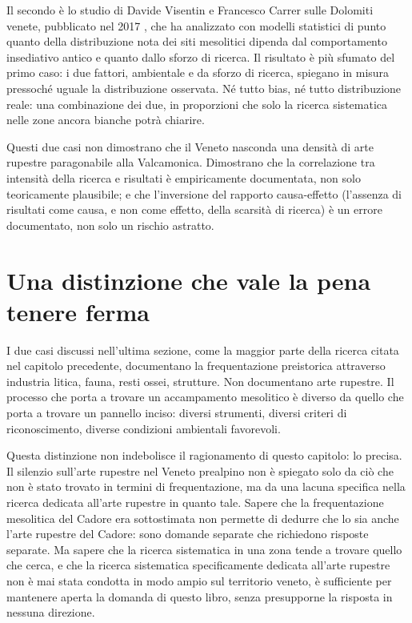 Il secondo è lo studio di Davide Visentin e Francesco Carrer sulle Dolomiti venete, pubblicato nel 2017 \citep{visentin2017}, che ha analizzato con modelli statistici di punto quanto della distribuzione nota dei siti mesolitici dipenda dal comportamento insediativo antico e quanto dallo sforzo di ricerca. Il risultato è più sfumato del primo caso: i due fattori, ambientale e da sforzo di ricerca, spiegano in misura pressoché uguale la distribuzione osservata. Né tutto bias, né tutto distribuzione reale: una combinazione dei due, in proporzioni che solo la ricerca sistematica nelle zone ancora bianche potrà chiarire.

Questi due casi non dimostrano che il Veneto nasconda una densità di arte rupestre paragonabile alla Valcamonica. Dimostrano che la correlazione tra intensità della ricerca e risultati è empiricamente documentata, non solo teoricamente plausibile; e che l'inversione del rapporto causa-effetto (l'assenza di risultati come causa, e non come effetto, della scarsità di ricerca) è un errore documentato, non solo un rischio astratto.

\section{Una distinzione che vale la pena tenere ferma}

I due casi discussi nell'ultima sezione, come la maggior parte della ricerca citata nel capitolo precedente, documentano la frequentazione preistorica attraverso industria litica, fauna, resti ossei, strutture. Non documentano arte rupestre. Il processo che porta a trovare un accampamento mesolitico è diverso da quello che porta a trovare un pannello inciso: diversi strumenti, diversi criteri di riconoscimento, diverse condizioni ambientali favorevoli.

Questa distinzione non indebolisce il ragionamento di questo capitolo: lo precisa. Il silenzio sull'arte rupestre nel Veneto prealpino non è spiegato solo da ciò che non è stato trovato in termini di frequentazione, ma da una lacuna specifica nella ricerca dedicata all'arte rupestre in quanto tale. Sapere che la frequentazione mesolitica del Cadore era sottostimata non permette di dedurre che lo sia anche l'arte rupestre del Cadore: sono domande separate che richiedono risposte separate. Ma sapere che la ricerca sistematica in una zona tende a trovare quello che cerca, e che la ricerca sistematica specificamente dedicata all'arte rupestre non è mai stata condotta in modo ampio sul territorio veneto, è sufficiente per mantenere aperta la domanda di questo libro, senza presupporne la risposta in nessuna direzione.
